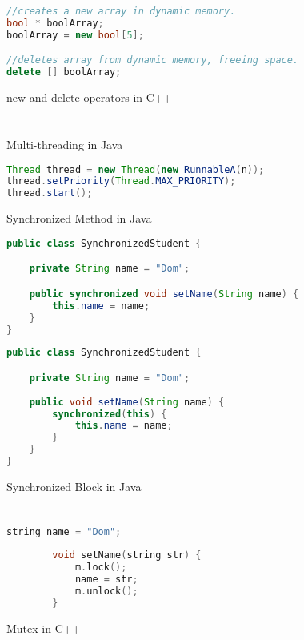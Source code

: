 \documentclass[]{report}
\begin{document}
\chapter{}
\begin{figure}[h!]
	\caption{new and delete operators in C++}
	\begin{lstlisting}[language=C++,frame=single]
//creates a new array in dynamic memory.
bool * boolArray;
boolArray = new bool[5]; 

//deletes array from dynamic memory, freeing space.
delete [] boolArray; 
	\end{lstlisting}
\end{figure}

\chapter{}
\begin{figure}[h!]
	\caption{Multi-threading in Java}
	\begin{lstlisting}[language=Java,frame=single]
Thread thread = new Thread(new RunnableA(n));
thread.setPriority(Thread.MAX_PRIORITY);
thread.start();
	\end{lstlisting}

	\caption{Synchronized Method in Java}
	\begin{lstlisting}[language=Java,frame=single]
public class SynchronizedStudent {

	private String name = "Dom";

	public synchronized void setName(String name) {
		this.name = name;
	}
}
	\end{lstlisting}
	\caption{Synchronized Block in Java}
\begin{lstlisting}[language=Java,frame=single]
public class SynchronizedStudent {

	private String name = "Dom";
	
	public void setName(String name) {
		synchronized(this) {
			this.name = name;
		}
	}
}
\end{lstlisting}
\end{figure}

\chapter{}
\begin{figure}[h!]
	\caption{Mutex in C++}
	\begin{lstlisting}[language=C++,frame=single]	
		string name = "Dom";
		
		void setName(string str) {
			m.lock();
			name = str;
			m.unlock();
		}
	\end{lstlisting}
\end{figure}
\end{document}
